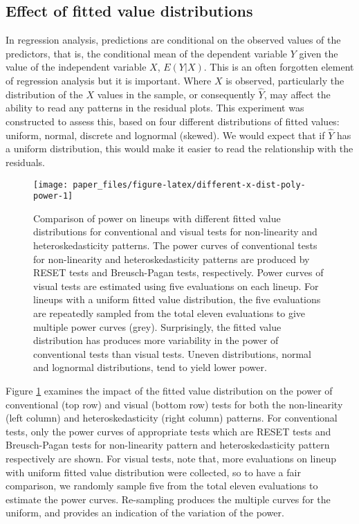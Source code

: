 \documentclass[]{interact}
\theoremstyle{plain}%
\theoremstyle{definition}
\theoremstyle{remark}
\begin{document}
\hypertarget{effect-of-fitted-value-distributions}{%
\subsection{Effect of fitted value
distributions}\label{effect-of-fitted-value-distributions}}

In regression analysis, predictions are conditional on the observed
values of the predictors, that is, the conditional mean of the dependent
variable \(Y\) given the value of the independent variable \(X\),
\(E(Y|X)\). This is an often forgotten element of regression analysis
but it is important. Where \(X\) is observed, particularly the
distribution of the \(X\) values in the sample, or consequently
\(\hat{Y}\), may affect the ability to read any patterns in the residual
plots. This experiment was constructed to assess this, based on four
different distributions of fitted values: uniform, normal, discrete and
lognormal (skewed). We would expect that if \(\hat{Y}\) has a uniform
distribution, this would make it easier to read the relationship with
the residuals.

\begin{figure}[t!]

{\centering \texttt{[image: paper\_files/figure-latex/different-x-dist-poly-power-1]} 

}

\caption{Comparison of power on lineups with different fitted value distributions for conventional and visual tests for non-linearity and heteroskedasticity patterns. The power curves of conventional tests for non-linearity and heteroskedasticity patterns are produced by RESET tests and Breusch-Pagan tests, respectively. Power curves of visual tests are estimated using five evaluations on each lineup. For lineups with a uniform fitted value distribution, the five evaluations are repeatedly sampled from the total eleven evaluations to give multiple power curves (grey). Surprisingly, the fitted value distribution has produces more variability in the power of conventional tests than visual tests. Uneven distributions, normal and lognormal distributions, tend to yield lower power.}\label{fig:different-x-dist-poly-power}
\end{figure}

Figure \ref{fig:different-x-dist-poly-power} examines the impact of the
fitted value distribution on the power of conventional (top row) and
visual (bottom row) tests for both the non-linearity (left column) and
heteroskedasticity (right column) patterns. For conventional tests, only
the power curves of appropriate tests which are RESET tests and
Breusch-Pagan tests for non-linearity pattern and heteroskedasticity
pattern respectively are shown. For visual tests, note that, more
evaluations on lineup with uniform fitted value distribution were
collected, so to have a fair comparison, we randomly sample five from
the total eleven evaluations to estimate the power curves. Re-sampling
produces the multiple curves for the uniform, and provides an indication
of the variation of the power.
\end{document}
